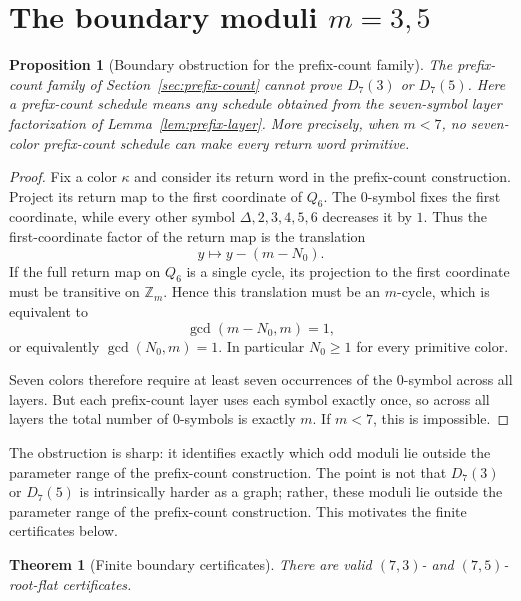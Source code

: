 \documentclass[11pt]{article}
\newtheorem{theorem}{Theorem}
\newtheorem{proposition}{Proposition}
\theoremstyle{definition}
\begin{document}
\section{The boundary moduli \texorpdfstring{\(m=3,5\)}{m=3,5}}\label{sec:exceptional}

\begin{proposition}[Boundary obstruction for the prefix-count family]\label{prop:boundary-obstruction}
The prefix-count family of Section~\ref{sec:prefix-count} cannot prove \(D_7(3)\) or \(D_7(5)\).
Here a prefix-count schedule means any schedule obtained from the seven-symbol layer factorization of Lemma~\ref{lem:prefix-layer}.  More precisely, when \(m<7\), no seven-color prefix-count schedule can make every return word primitive.
\end{proposition}

\begin{proof}
Fix a color \(\kappa\) and consider its return word in the prefix-count construction.  Project its return map to the first coordinate of \(Q_6\).  The \(0\)-symbol fixes the first coordinate, while every other symbol \(\Delta,2,3,4,5,6\) decreases it by \(1\).  Thus the first-coordinate factor of the return map is the translation
\[
y\longmapsto y-(m-N_0).
\]
If the full return map on \(Q_6\) is a single cycle, its projection to the first coordinate must be transitive on \(\mathbb Z_m\).  Hence this translation must be an \(m\)-cycle, which is equivalent to
\[
\gcd(m-N_0,m)=1,
\]
or equivalently \(\gcd(N_0,m)=1\).  In particular \(N_0\ge1\) for every primitive color.

Seven colors therefore require at least seven occurrences of the \(0\)-symbol across all layers.  But each prefix-count layer uses each symbol exactly once, so across all layers the total number of \(0\)-symbols is exactly \(m\).  If \(m<7\), this is impossible.
\end{proof}

The obstruction is sharp: it identifies exactly which odd moduli lie outside the parameter range of the prefix-count construction.  The point is not that \(D_7(3)\) or \(D_7(5)\) is intrinsically harder as a graph; rather, these moduli lie outside the parameter range of the prefix-count construction.  This motivates the finite certificates below.

\begin{theorem}[Finite boundary certificates]\label{thm:finite-exceptional}
There are valid \((7,3)\)- and \((7,5)\)-root-flat certificates.
\end{theorem}
\end{document}
